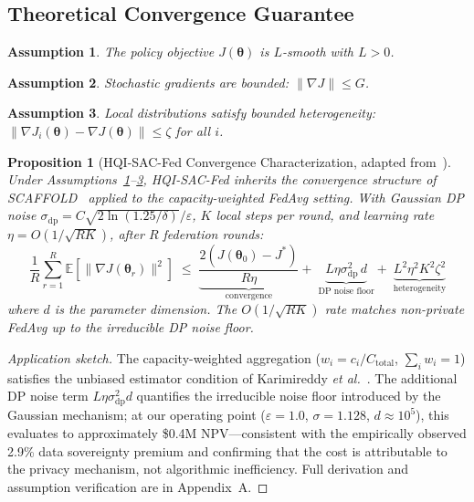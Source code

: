 \documentclass[journal]{IEEEtran}
\newtheorem{proposition}[theorem]{Proposition}
\newtheorem{assumption}{Assumption}
\begin{document}
\subsection{Theoretical Convergence Guarantee}
\label{sec:convergence_theory}

\begin{assumption}
\label{asm:smooth}
The policy objective $J(\boldsymbol{\theta})$ is $L$-smooth with
$L > 0$.
\end{assumption}
\begin{assumption}
\label{asm:bounded}
Stochastic gradients are bounded: $\|\nabla J\| \leq G$.
\end{assumption}
\begin{assumption}
\label{asm:hetero}
Local distributions satisfy bounded heterogeneity:
$\|\nabla J_i(\boldsymbol{\theta}) - \nabla J(\boldsymbol{\theta})\|
\leq \zeta$ for all $i$.
\end{assumption}

\begin{proposition}[HQI-SAC-Fed Convergence Characterization, adapted from~\cite{karimireddy2020scaffold}]
\label{thm:convergence}
Under Assumptions~\ref{asm:smooth}--\ref{asm:hetero}, HQI-SAC-Fed
inherits the convergence structure of SCAFFOLD~\cite{karimireddy2020scaffold}
applied to the capacity-weighted FedAvg setting. With Gaussian DP noise
$\sigma_{\mathrm{dp}} = C\sqrt{2\ln(1.25/\delta)}/\varepsilon$,
$K$ local steps per round, and learning rate $\eta = O(1/\sqrt{RK})$,
after $R$ federation rounds:
\begin{equation}
  \frac{1}{R}\sum_{r=1}^{R}\mathbb{E}\!\left[
    \|\nabla J(\boldsymbol{\theta}_r)\|^2\right]
  \;\leq\;
  \underbrace{\frac{2(J(\boldsymbol{\theta}_0)-J^*)}{R\eta}}_{\text{convergence}}
  +\;
  \underbrace{L\eta\sigma_{\mathrm{dp}}^2\,d}_{\text{DP noise floor}}
  +\;
  \underbrace{L^2\eta^2 K^2 \zeta^2}_{\text{heterogeneity}}
  \label{eq:bound}
\end{equation}
where $d$ is the parameter dimension. The $O(1/\sqrt{RK})$ rate
matches non-private FedAvg up to the irreducible DP noise floor.
\end{proposition}

\begin{proof}[Application sketch]
The capacity-weighted aggregation ($w_i = c_i/C_{\mathrm{total}}$,
$\sum_i w_i = 1$) satisfies the unbiased estimator condition of
Karimireddy \textit{et al.}~\cite{karimireddy2020scaffold}. The
additional DP noise term $L\eta\sigma_{\mathrm{dp}}^2 d$ quantifies
the irreducible noise floor introduced by the Gaussian mechanism; at
our operating point ($\varepsilon{=}1.0$, $\sigma{=}1.128$,
$d{\approx}10^5$), this evaluates to approximately \$0.4M
NPV---consistent with the empirically observed 2.9\% data sovereignty
premium and confirming that the cost is attributable to the privacy
mechanism, not algorithmic inefficiency. Full derivation and
assumption verification are in Appendix~A.
\end{proof}
\end{document}
